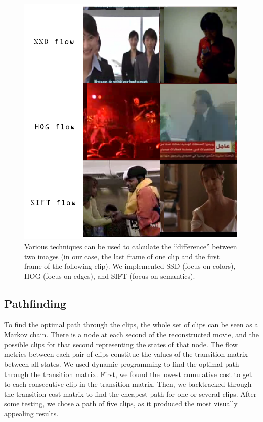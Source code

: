 \begin{figure}
\centering
    \includegraphics[width=1.0\columnwidth]{figures/lowflowstitled.png}
\caption{Various techniques can be used to calculate the ``difference'' between two images (in our case, the last frame of one clip and the first frame of the following clip).  We implemented SSD (focus on colors), HOG (focus on edges), and SIFT (focus on semantics).}
\label{fig:flows}
\end{figure}

\subsection{Pathfinding}
To find the optimal path through the clips, the whole set of clips can be seen as a Markov chain. There is a node at each second of the reconstructed movie, and the possible clips for that second representing the states of that node. The flow metrics between each pair of clips constitue the values of the transition matrix between all states. We used dynamic programming to find the optimal path through the transition matrix. First, we found the lowest cumulative cost to get to each consecutive clip in the transition matrix. Then, we backtracked through the transition cost matrix to find the cheapest path for one or several clips. After some testing, we chose a path of five clips, as it produced the most visually appealing results.

